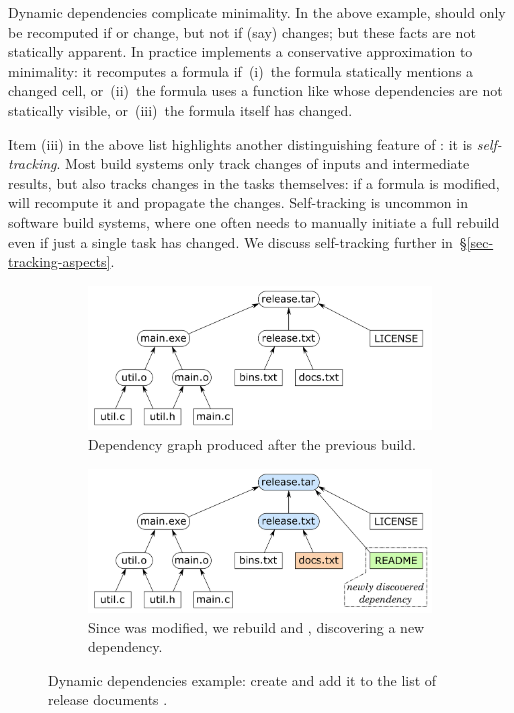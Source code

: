 Dynamic dependencies complicate minimality.  In the above example, 
should only be recomputed if  or  change, but not if (say)
 changes; but these facts are not statically apparent. In practice
\Excel implements a conservative approximation to minimality: it recomputes a
formula if~(i)~the formula statically mentions a changed cell, or~(ii)~the formula uses a
function like  whose dependencies are not statically visible,
or~(iii)~the formula itself has changed.

Item (iii) in the above list highlights another distinguishing feature of \Excel: it
is \emph{self-tracking}. Most build systems only track changes of inputs and
intermediate results, but \Excel also tracks changes in the tasks themselves: if
a formula is modified, \Excel will recompute it and propagate the changes.
Self-tracking is uncommon in software build systems, where one often needs to
manually initiate a full rebuild even if just a single task has changed.
We discuss self-tracking further in~\S\ref{sec-tracking-aspects}.

\begin{figure}
\begin{subfigure}[b]{0.90\linewidth}
\centerline{\includegraphics[scale=0.28]{fig/shake-example.pdf}}
\caption{Dependency graph produced after the previous build.}
\end{subfigure}
\begin{subfigure}[b]{0.90\linewidth}
\centerline{\includegraphics[scale=0.28]{fig/shake-example-rebuild.pdf}}
\caption{Since  was modified, we rebuild  and
, discovering a new dependency.}
\end{subfigure}
\caption{Dynamic dependencies example: create  and add it to the
list of release documents .\label{fig-shake}}
\end{figure}

